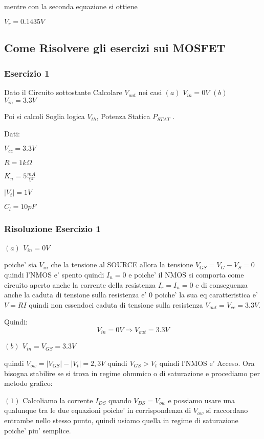 \documentclass[\main/main.tex]{subfiles}
\begin{document}
mentre con la seconda equazione si ottiene

$V_r = 0.1435V$


\clearpage
\subsection{Come Risolvere gli esercizi sui MOSFET}
\subsubsection{Esercizio 1}
Dato il Circuito sottostante Calcolare $V_{out}$ nei casi 
$(a)$ $V_{in} = 0V$
$(b)$ $V_{in} = 3.3V$

Poi si calcoli Soglia logica $V_{th}$, Potenza Statica $P_{STAT}$ .

Dati:

$V_{cc} = 3.3V$

$R = 1k\Omega$
 
$K_n = 5 \frac{mA}{V^2}$
  
$|V_t| = 1V$

$C_l = 10pF$

\clearpage
\subsubsection{Risoluzione Esercizio 1}
\textbf{$(a)$ $V_{in} = 0V$}

poiche' sia $V_{in}$ che la tensione al SOURCE allora la tensione $V_{GS} = V_G - V_S = 0$ quindi l'NMOS e' spento quindi $I_n = 0$ e poiche' il NMOS si comporta come circuito aperto anche la corrente della resistenza $I_r = I_n = 0$ e di conseguenza anche la caduta di tensione sulla resistenza e' $0$ poiche' la sua eq caratteristica e' $V = RI$ quindi non essendoci caduta di tensione sulla resistenza $V_{out} = V_{cc} = 3.3V$.

Quindi:
 \[V_{in} = 0V \Rightarrow V_{out} = 3.3V\]
 

\textbf{$(b)$ $V_{in} = V_{GS} = 3.3V$}

quindi $V_{ow} = |V_{GS}| - |V_t| = 2,3V$ quindi $V_{GS} > V_t$ quindi l'NMOS e' Acceso.
Ora bisogna stabilire se si trova in regime ohmmico o di saturazione e procediamo per metodo grafico:

$(1)$ Calcoliamo la corrente $I_{DS}$ quando $V_{DS} = V_{ow}$ e possiamo usare una qualunque tra le due equazioni poiche' in corrispondenza di $V_{ow}$ si raccordano entrambe nello stesso punto, quindi usiamo quella in regime di saturazione poiche' piu' semplice.
\end{document}
